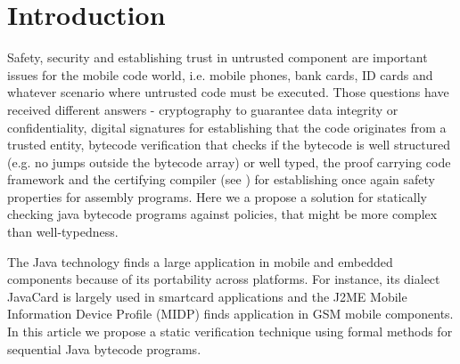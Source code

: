 
\section{Introduction}\label{intro}
Safety, security and establishing trust in untrusted component are important issues for the mobile code world, 
i.e. mobile phones, bank cards, ID cards and whatever scenario where 
untrusted code must be executed. Those questions have received different answers - cryptography to guarantee data integrity or confidentiality,
 digital signatures for establishing that the code originates from a trusted entity, bytecode verification that checks if the bytecode 
 is well structured (e.g. no jumps outside the bytecode array) or well typed, 
 the proof carrying code framework  and the certifying compiler (see \cite{ComNec,DesNecLee98}) for establishing once 
 again safety properties for assembly programs.  Here we a propose a solution for statically checking java bytecode programs against
 policies, that might be more complex than well-typedness.  


The Java technology finds a large application in mobile and embedded components because of its portability across platforms. 
For instance, its dialect JavaCard is largely used in smartcard applications and the J2ME Mobile Information Device Profile (MIDP) finds application in GSM mobile components. 
In this article we propose a static verification technique using formal methods for sequential Java bytecode programs.

